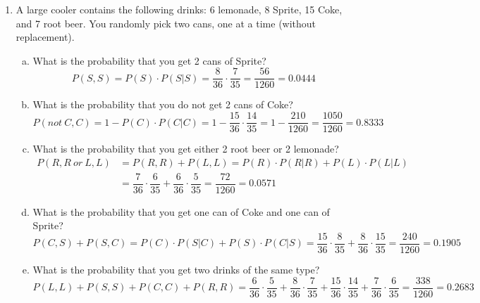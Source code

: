 \begin{enumerate}
\item A large cooler contains the following drinks: 6 lemonade, 8 Sprite, 15 Coke, and 7 root beer. You randomly pick two cans, one at a time (without replacement).
\begin{enumerate}[(a)]
\item What is the probability that you get 2 cans of Sprite? 
\[P(S,S) = P(S) \cdot P(S | S) = \dfrac{8}{36} \cdot \dfrac{7}{35} = \dfrac{56}{1260} = 0.0444\]
\item What is the probability that you do not get 2 cans of Coke? 
\[P(not\ C,C) = 1 - P(C) \cdot P(C | C) = 1 - \dfrac{15}{36} \cdot \dfrac{14}{35} = 1 - \dfrac{210}{1260} = \dfrac{1050}{1260} = 0.8333\]
\item What is the probability that you get either 2 root beer or 2 lemonade? 
\begin{align*}
P(R,R\ or\ L,L) &= P(R,R) + P(L,L) = P(R) \cdot P(R | R) + P(L) \cdot P(L | L)\\
&= \dfrac{7}{36} \cdot \dfrac{6}{35} + \dfrac{6}{36} \cdot \dfrac{5}{35} = \dfrac{72}{1260} = 0.0571
\end{align*}
\item What is the probability that you get one can of Coke and one can of Sprite? 
\[P(C,S) + P(S,C) = P(C) \cdot P(S | C) + P(S) \cdot P(C | S) = \dfrac{15}{36} \cdot \dfrac{8}{35} + \dfrac{8}{36} \cdot \dfrac{15}{35} = \dfrac{240}{1260} = 0.1905\]
\item What is the probability that you get two drinks of the same type? 
\[P(L,L) + P(S,S) + P(C,C) + P(R,R) = \dfrac{6}{36} \cdot \dfrac{5}{35} + \dfrac{8}{36} \cdot \dfrac{7}{35} + \dfrac{15}{36} \cdot \dfrac{14}{35} + \dfrac{7}{36} \cdot \dfrac{6}{35} = \dfrac{338}{1260} = 0.2683\]
\end{enumerate}


\end{enumerate}
